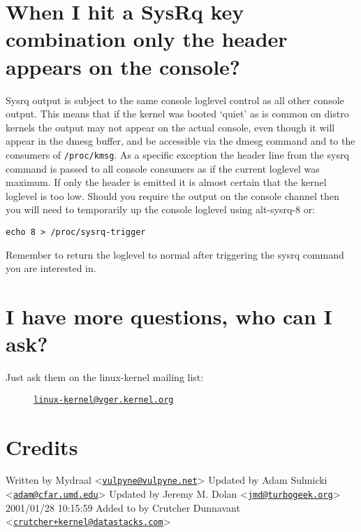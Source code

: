 \documentclass[article,letterpaper]{memoir}
\let\subsection\section
\let\section\chapter
\begin{document}
\subsection{When I hit a SysRq key combination only the header appears
on the
console?}\label{when-i-hit-a-sysrq-key-combination-only-the-header-appears-on-the-console}

Sysrq output is subject to the same console loglevel control as all
other console output. This means that if the kernel was booted `quiet'
as is common on distro kernels the output may not appear on the actual
console, even though it will appear in the dmesg buffer, and be
accessible via the dmesg command and to the consumers of
\texttt{/proc/kmsg}. As a specific exception the header line from the
sysrq command is passed to all console consumers as if the current
loglevel was maximum. If only the header is emitted it is almost certain
that the kernel loglevel is too low. Should you require the output on
the console channel then you will need to temporarily up the console
loglevel using alt-sysrq-8 or:

\begin{verbatim}
echo 8 > /proc/sysrq-trigger
\end{verbatim}

Remember to return the loglevel to normal after triggering the sysrq
command you are interested in.

\subsection{I have more questions, who can I
ask?}\label{i-have-more-questions-who-can-i-ask}

\begin{description}
\item[Just ask them on the linux-kernel mailing list:]
\href{mailto:linux-kernel@vger.kernel.org}{\nolinkurl{linux-kernel@vger.kernel.org}}
\end{description}

\subsection{Credits}\label{credits}

Written by Mydraal
\textless{}\href{mailto:vulpyne@vulpyne.net}{\nolinkurl{vulpyne@vulpyne.net}}\textgreater{}
Updated by Adam Sulmicki
\textless{}\href{mailto:adam@cfar.umd.edu}{\nolinkurl{adam@cfar.umd.edu}}\textgreater{}
Updated by Jeremy M. Dolan
\textless{}\href{mailto:jmd@turbogeek.org}{\nolinkurl{jmd@turbogeek.org}}\textgreater{}
2001/01/28 10:15:59 Added to by Crutcher Dunnavant
\textless{}\href{mailto:crutcher+kernel@datastacks.com}{\nolinkurl{crutcher+kernel@datastacks.com}}\textgreater{}
\end{document}
